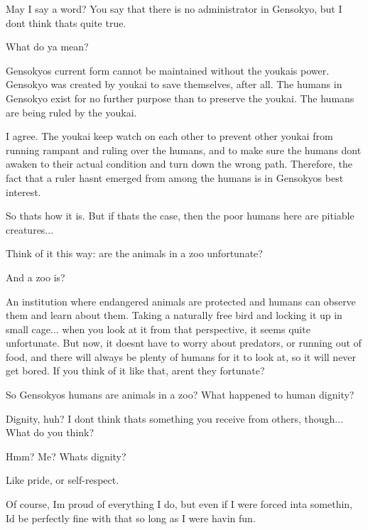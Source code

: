 \begin{tcolorbox}[breakable, colback=white, colframe=black!80,
  boxrule=0.6pt, arc=0mm, left=3mm, right=3mm, top=2mm, bottom=2mm]
\medskip
May I say a word? You say that there is no administrator in Gensokyo, but I don\textquotesingle{}t think that\textquotesingle{}s quite true.\par
\medskip
What do ya mean?\par
\medskip
Gensokyo\textquotesingle{}s current form cannot be maintained without the youkai\textquotesingle{}s power. Gensokyo was created by youkai to save themselves, after all. The humans in Gensokyo exist for no further purpose than to preserve the youkai. The humans are being ruled by the youkai.\par
\medskip
I agree. The youkai keep watch on each other to prevent other youkai from running rampant and ruling over the humans, and to make sure the humans don\textquotesingle{}t awaken to their actual condition and turn down the wrong path. Therefore, the fact that a ruler hasn\textquotesingle{}t emerged from among the humans is in Gensokyo\textquotesingle{}s best interest.\par
\medskip
So that\textquotesingle{}s how it is. But if that\textquotesingle{}s the case, then the poor humans here are pitiable creatures...\par
\medskip
Think of it this way: are the animals in a zoo unfortunate?\par
\medskip
And a zoo is?\par
\medskip
An institution where endangered animals are protected and humans can observe them and learn about them. Taking a naturally free bird and locking it up in small cage... when you look at it from that perspective, it seems quite unfortunate. But now, it doesn\textquotesingle{}t have to worry about predators, or running out of food, and there will always be plenty of humans for it to look at, so it will never get bored. If you think of it like that, aren\textquotesingle{}t they fortunate?\par
\medskip
So Gensokyo\textquotesingle{}s humans are animals in a zoo? What happened to human dignity?\par
\medskip
Dignity, huh? I don\textquotesingle{}t think that\textquotesingle{}s something you receive from others, though... What do you think?\par
\medskip
Hmm? Me? What\textquotesingle{}s dignity?\par
\medskip
Like pride, or self-{}respect.\par
\medskip
Of course, I\textquotesingle{}m proud of everything I do, but even if I were forced inta somethin\textquotesingle{}, I\textquotesingle{}d be perfectly fine with that so long as I were havin\textquotesingle{} fun.\par

\end{tcolorbox}
